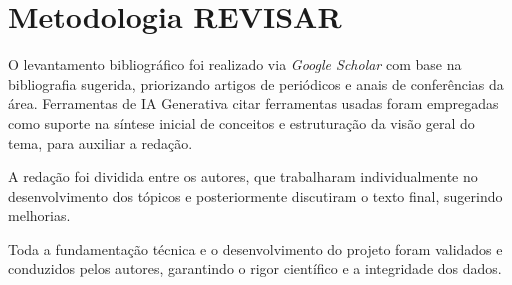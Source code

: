 \section{
    Metodologia  {\color{red} REVISAR}
} \label{sec:metodologia}

O levantamento bibliográfico foi realizado via \textit{Google Scholar} com base na bibliografia sugerida, priorizando artigos de periódicos e anais de conferências da área. Ferramentas de IA Generativa {\color{red} citar ferramentas usadas} foram empregadas como suporte na síntese inicial de conceitos e estruturação da visão geral do tema, para auxiliar a redação. 

A redação foi dividida entre os autores, que trabalharam individualmente no desenvolvimento dos tópicos e posteriormente discutiram o texto final, sugerindo melhorias. 

Toda a fundamentação técnica e o desenvolvimento do projeto foram validados e conduzidos pelos autores, garantindo o rigor científico e a integridade dos dados.
